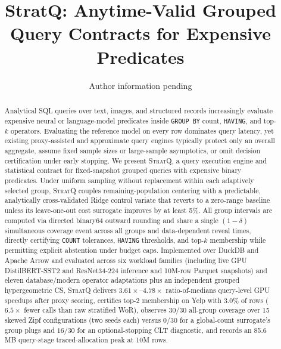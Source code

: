 \documentclass[sigconf, nonacm]{acmart}
\begin{document}
\title{StratQ: Anytime-Valid Grouped Query Contracts for Expensive Predicates}
\author{Author information pending}

\begin{abstract}
Analytical SQL queries over text, images, and structured records increasingly evaluate expensive neural or language-model predicates inside \texttt{GROUP BY} count, \texttt{HAVING}, and top-$k$ operators.
Evaluating the reference model on every row dominates query latency, yet existing proxy-assisted and approximate query engines typically protect only an overall aggregate, assume fixed sample sizes or large-sample asymptotics, or omit decision certification under early stopping.
We present \textsc{StratQ}, a query execution engine and statistical contract for fixed-snapshot grouped queries with expensive binary predicates.
Under uniform sampling without replacement within each adaptively selected group, \textsc{StratQ} couples remaining-population centering with a predictable, analytically cross-validated Ridge control variate that reverts to a zero-range baseline unless its leave-one-out cost surrogate improves by at least 5\%.
All group intervals are computed via directed binary64 outward rounding and share a single $(1-\delta)$ simultaneous coverage event across all groups and data-dependent reveal times, directly certifying \texttt{COUNT} tolerances, \texttt{HAVING} thresholds, and top-$k$ membership while permitting explicit abstention under budget caps.
Implemented over DuckDB and Apache Arrow and evaluated across six workload families (including live GPU DistilBERT-SST2 and ResNet34-224 inference and 10M-row Parquet snapshots) and eleven database/modern operator adaptations plus an independent grouped hypergeometric CS, \textsc{StratQ} delivers $3.61\times$--$4.78\times$ ratio-of-medians query-level GPU speedups after proxy scoring, certifies top-2 membership on Yelp with $3.0\%$ of rows ($6.5\times$ fewer calls than raw stratified WoR), observes $30/30$ all-group coverage over 15 skewed Zipf configurations (two seeds each) versus $0/30$ for a global-count surrogate's group plugs and $16/30$ for an optional-stopping CLT diagnostic, and records an 85.6\,MB query-stage traced-allocation peak at 10M rows.
\end{abstract}

\maketitle
\vldbtopmatter









\end{document}
